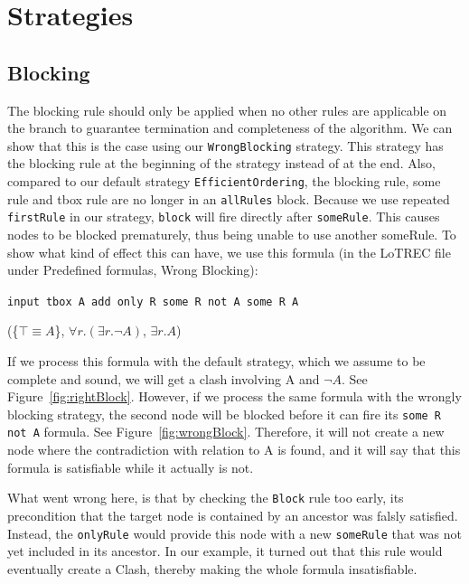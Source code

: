 \documentclass[11pt]{article} %
\begin{document}
\section{Strategies}
\label{sec:strategies}

\subsection{Blocking}

The blocking rule should only be applied when no other rules are applicable on the branch to guarantee termination and completeness of the algorithm. We can show that this is the case using our \texttt{WrongBlocking} strategy. This strategy has the blocking rule at the beginning of the strategy instead of at the end. Also, compared to our default strategy \texttt{EfficientOrdering}, the blocking rule, some rule and tbox rule are no longer in an \texttt{allRules} block. Because we use repeated \texttt{firstRule} in our strategy, \texttt{block} will fire directly after \texttt{someRule}. This causes nodes to be blocked prematurely, thus being unable to use another someRule. To show what kind of effect this can have, we use this formula (in the LoTREC file under Predefined formulas, Wrong Blocking):

\begin{center}
\texttt{input tbox A add only R some R not A some R A}

(\{$\top \equiv A$\}, $\forall r.(\exists r.\neg A)$, $\exists r.A$)
\end{center}

If we process this formula with the default strategy, which we assume to be complete and sound, we will get a clash involving A and $\neg A$. See Figure~\ref{fig:rightBlock}. However, if we process the same formula with the wrongly blocking strategy, the second node will be blocked before it can fire its \texttt{some R not A} formula. See Figure~\ref{fig:wrongBlock}. Therefore, it will not create a new node where the contradiction with relation to A is found, and it will say that this formula is satisfiable while it actually is not.

What went wrong here, is that by checking the \texttt{Block} rule too early, its precondition that the target node is contained by an ancestor was falsly satisfied. Instead, the \texttt{onlyRule} would provide this node with a new \texttt{someRule} that was not yet included in its ancestor. In our example, it turned out that this rule would eventually create a Clash, thereby making the whole formula insatisfiable.
 
\end{document}
